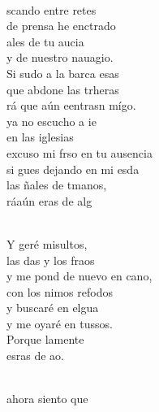 \begin{cancion}%
	    \\
	scando entre retes\\
	de prensa he enctrado\\
	ales de tu aucia  \\
	y de nuestro nauagio.\\
	Si sudo a la barca esas\\
	que abdone las trheras\\
	rá que aún eentrasn mígo. \\
	 ya no escucho a ie \\
	en las iglesias\\
	excuso mi frso en tu ausencia\\
	si gues dejando en mi esda\\
	las ñales de tmanos,\\
	ráaún eras de  alg\\\jump\\
	\begin{chorus}%
	Y geré misultos,\\
	las das y los fraos\\
	y me pond de nuevo en cano, \\
	con los nimos refodos\\
	y  buscaré en elgua\\
	y me oyaré en tussos.\\
	Porque lamente   \\
	esras de  ao.\\
	\end{chorus}%
	\jump\\
	ahora siento que \\

\end{cancion}
